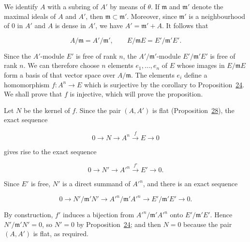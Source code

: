 We identify $A$ with a subring of $A'$ by means of $\theta$. If
$\mathfrak{m}$ and $\mathfrak{m}'$ denote the maximal ideals of $A$ and $A'$,
then $\mathfrak{m}\subset\mathfrak{m}'$. Moreover, since $\mathfrak{m}'$ is a
neighbourhood of $0$ in $A'$ and $A$ is dense in $A'$, we have
$A'=\mathfrak{m}'+A$. It follows that

\begin{equation*}
A/\mathfrak{m}=A'/\mathfrak{m}',
\qquad
E/\mathfrak{m}E=E'/\mathfrak{m}'E'.
\end{equation*}

Since the $A'$-module $E'$ is free of rank $n$, the
$A'/\mathfrak{m}'$-module $E'/\mathfrak{m}'E'$ is free of rank $n$. We can
therefore choose $n$ elements $e_1,\ldots,e_n$ of $E$ whose images in
$E/\mathfrak{m}E$ form a basis of that vector space over
$A/\mathfrak{m}$. The elements $e_i$ define a homomorphism
$f:A^n\to E$ which is surjective by the corollary to
Proposition~\hyperref[gaga:prop:24]{24}. We shall prove that $f$ is injective,
which will prove the proposition.

Let $N$ be the kernel of $f$. Since the pair $(A,A')$ is flat
(Proposition~\hyperref[gaga:prop:28]{28}), the exact sequence

\begin{equation*}
0\longrightarrow N\longrightarrow A^n\xrightarrow{f}E\longrightarrow0
\end{equation*}

gives rise to the exact sequence

\begin{equation*}
0\longrightarrow N'\longrightarrow {A'}^n
\xrightarrow{f'}E'\longrightarrow0.
\end{equation*}

Since $E'$ is free, $N'$ is a direct summand of ${A'}^n$, and there is an
exact sequence

\begin{equation*}
0\longrightarrow N'/\mathfrak{m}'N'
\longrightarrow {A'}^n/\mathfrak{m}'{A'}^n
\longrightarrow E'/\mathfrak{m}'E'\longrightarrow0.
\end{equation*}

By construction, $f'$ induces a bijection from
${A'}^n/\mathfrak{m}'{A'}^n$ onto $E'/\mathfrak{m}'E'$. Hence
$N'/\mathfrak{m}'N'=0$, so $N'=0$ by
Proposition~\hyperref[gaga:prop:24]{24}; and then $N=0$ because the pair
$(A,A')$ is flat, as required.


